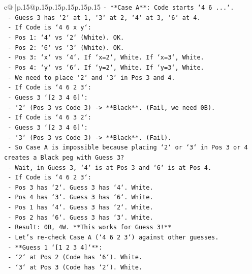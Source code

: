 \documentclass{article}
\begin{document}
{\begin{supertabular}{c@{$\;$}|p{.15\linewidth}@{}p{.15\linewidth}p{.15\linewidth}p{.15\linewidth}p{.15\linewidth}p{.15\linewidth}}
{{{\texttt{{-} **Case A**: Code starts `4 6 ...`.} \\
\texttt{  {-} Guess 3 has `2` at 1, `3` at 2, `4` at 3, `6` at 4.} \\
\texttt{  {-} If Code is `4 6 x y`:} \\
\texttt{    {-} Pos 1: `4` vs `2` (White). OK.} \\
\texttt{    {-} Pos 2: `6` vs `3` (White). OK.} \\
\texttt{    {-} Pos 3: `x` vs `4`. If `x=2`, White. If `x=3`, White.} \\
\texttt{    {-} Pos 4: `y` vs `6`. If `y=2`, White. If `y=3`, White.} \\
\texttt{  {-} We need to place `2` and `3` in Pos 3 and 4.} \\
\texttt{  {-} If Code is `4 6 2 3`:} \\
\texttt{    {-} Guess 3 `{[}2 3 4 6{]}`:} \\
\texttt{      {-} `2` (Pos 3 vs Code 3) {-}> **Black**. (Fail, we need 0B).} \\
\texttt{  {-} If Code is `4 6 3 2`:} \\
\texttt{    {-} Guess 3 `{[}2 3 4 6{]}`:} \\
\texttt{      {-} `3` (Pos 3 vs Code 3) {-}> **Black**. (Fail).} \\
\texttt{  {-} So Case A is impossible because placing `2` or `3` in Pos 3 or 4 creates a Black peg with Guess 3?} \\
\texttt{    {-} Wait, in Guess 3, `4` is at Pos 3 and `6` is at Pos 4.} \\
\texttt{    {-} If Code is `4 6 2 3`:} \\
\texttt{      {-} Pos 3 has `2`. Guess 3 has `4`. White.} \\
\texttt{      {-} Pos 4 has `3`. Guess 3 has `6`. White.} \\
\texttt{      {-} Pos 1 has `4`. Guess 3 has `2`. White.} \\
\texttt{      {-} Pos 2 has `6`. Guess 3 has `3`. White.} \\
\texttt{      {-} Result: 0B, 4W. **This works for Guess 3!**} \\
\texttt{    {-} Let's re{-}check Case A (`4 6 2 3`) against other guesses.} \\
\texttt{      {-} **Guess 1 `{[}1 2 3 4{]}`**:} \\
\texttt{        {-} `2` at Pos 2 (Code has `6`). White.} \\
\texttt{        {-} `3` at Pos 3 (Code has `2`). White.} \\
}}}
\end{supertabular}}
\end{document}

